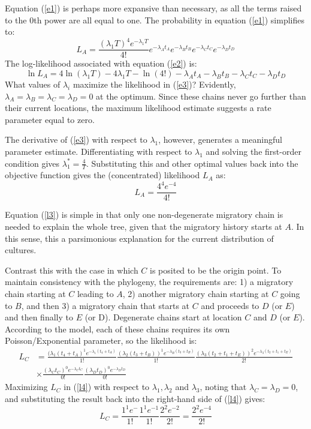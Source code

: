 \documentclass[11pt]{article}
\begin{document}
Equation (\ref{e1}) is perhaps more expansive than necessary, as all the terms raised to the $0$th power are all equal to one. The probability in equation (\ref{e1}) simplifies to:
\begin{equation} \label{e2}
L_A = \frac{(\lambda_1 T)^4e^{-\lambda_1T}}{4!}e^{-\lambda_At_A}e^{-\lambda_Bt_B}e^{-\lambda_Ct_C}e^{-\lambda_Dt_D}
\end{equation} 
The log-likelihood associated with equation (\ref{e2}) is:
\begin{equation} \label{e3}
\ln L_A  = 4\ln(\lambda_1 T) -4\lambda_1T-\ln(4!)-\lambda_At_A-\lambda_Bt_B-\lambda_Ct_C-\lambda_Dt_D
\end{equation} 
What values of $\lambda_i$ maximize the likelihood in (\ref{e3})? Evidently, $\lambda_A=\lambda_B=\lambda_C=\lambda_D=0$ at the optimum. Since these chains never go further than their current locations, the maximum likelihood estimate suggests a rate parameter equal to zero. 

The derivative of (\ref{e3}) with respect to $\lambda_1$, however, generates a meaningful parameter estimate. Differentiating with respect to $\lambda_1$ and solving the first-order condition gives $\lambda_1^*=\frac{4}{T}$. Substituting this and other optimal values back into the objective function gives the (concentrated) likelihood $L_A$ as:
\begin{equation}  \label{l3}
L_A=\frac{4^4e^{-4}}{4!}
\end{equation}

Equation (\ref{l3}) is simple in that only one non-degenerate migratory chain is needed to explain the whole tree, given that the migratory history starts at $A$. In this sense, this a parsimonious explanation for the current distribution of cultures. 

Contrast this with the case in which $C$ is posited to be the origin point. To maintain consistency with the phylogeny, the requirements are:  1) a migratory chain starting at $C$ leading to $A$, 2) another migratory chain starting at $C$ going to $B$, and then 3) a migratory chain that starts at $C$ and proceeds to $D$ (or $E$) and then finally to $E$ (or D). Degenerate chains start at location $C$ and $D$ (or $E$). According to the model, each of these chains requires its own Poisson/Exponential parameter, so the likelihood is:
\begin{eqnarray} \label{l4}
L_{C}&=\frac{(\lambda_1(t_4+t_A)^1e^{-\lambda_1(t_4+t_A)}}{1!}\frac{(\lambda_2(t_3+t_B))^1e^{-\lambda_B(t_3+t_B)}}{1!}
\frac{(\lambda_3(t_2+t_1+t_E))^2e^{-\lambda_3(t_2+t_1+t_E)}}{2!} \nonumber \\
&\times\frac{(\lambda_Ct_C)^0e^{-\lambda_Ct_C}}{0!}\frac{(\lambda_Dt_D)^0e^{-\lambda_Dt_D}}{0!}
\end{eqnarray} 
Maximizing $L_{C}$ in (\ref{l4}) with respect to $\lambda_1,\lambda_2$ and $\lambda_3$, noting that $\lambda_C=\lambda_D=0$, and substituting the result back into the right-hand side of (\ref{l4}) gives:
\begin{equation} \label{l5}
L_{C}=\frac{1^1e^{-}}{1!}\frac{1^{1}e^{-1}}{1!}\frac{2^2e^{-2}}{2!}=
\frac{2^2e^{-4}}{2!}
\end{equation} 
\end{document}
